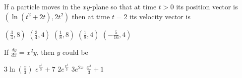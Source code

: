 \begin{questions}
\question[2] If a particle moves in the $xy$-plane so that at time $t
    > 0$ its position vector is $(\ln(t^2 + 2t), 2t^2)$ then at time
      $t = 2$ its velocity vector is

    \begin{oneparchoices}
    \CorrectChoice $(\frac{3}{4}, 8)$
    \choice $(\frac{3}{4}, 4)$
    \choice $(\frac{1}{8}, 8)$
    \choice $(\frac{1}{8}, 4)$
    \choice $(-\frac{5}{16}, 4)$
    \end{oneparchoices}

\question[2] If $\frac{dy}{dx} = x^2y$, then $y$ could be

    \begin{oneparchoices}
    \choice $3\ln(\frac{x}{3})$
    \choice $e^\frac{x^3}{3} + 7$
    \CorrectChoice $2e^\frac{x^3}{3}$
    \choice $3e^{2x}$
    \choice $\frac{x^3}{3} + 1$
    \end{oneparchoices}
\end{questions}

